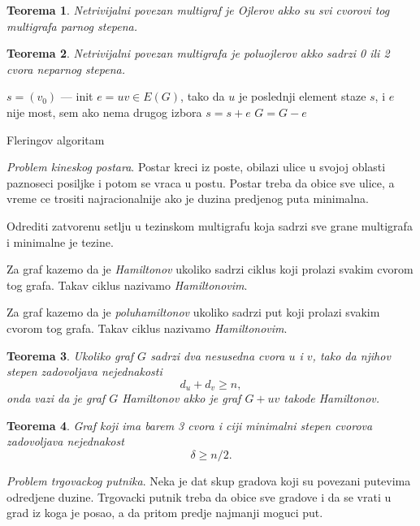 \documentclass[12p, a4paper]{article}
\newtheorem*{theorem}{Teorema}
\begin{document}
\begin{multicols}{2}
    \begin{theorem}
        Netrivijalni povezan multigraf je Ojlerov akko su svi cvorovi tog 
        multigrafa parnog stepena.
    \end{theorem}

    \begin{theorem}
        Netrivijalni povezan multigrafa je poluojlerov akko sadrzi
        0 ili 2 cvora neparnog stepena.
    \end{theorem}

    \begin{algorithm}[H]
        $s = (v_0)$ --- init\;
        {$e = uv \in E(G)$, tako da $u$ je poslednji element staze $s$, 
        i $e$ nije most, sem ako nema drugog izbora\;
        $s = s + e$\;
        $G = G - e$\;}
        \caption{Fleringov algoritam}
    \end{algorithm}

    \emph{Problem kineskog postara}. Postar kreci iz poste, obilazi ulice
    u svojoj oblasti paznoseci posiljke i potom se vraca u postu.
    Postar treba da obice sve ulice, a vreme ce trositi najracionalnije ako je
    duzina predjenog puta minimalna.

    Odrediti zatvorenu setlju u tezinskom multigrafu koja sadrzi sve grane 
    multigrafa i minimalne je tezine.

    Za graf kazemo da je \emph{Hamiltonov} ukoliko sadrzi ciklus koji prolazi 
    svakim cvorom tog grafa. Takav ciklus nazivamo \emph{Hamiltonovim}.

    Za graf kazemo da je \emph{poluhamiltonov} ukoliko sadrzi put koji prolazi 
    svakim cvorom tog grafa. Takav ciklus nazivamo \emph{Hamiltonovim}.

    \begin{theorem}
        Ukoliko graf $G$ sadrzi dva nesusedna cvora $u$ i $v$, tako da njihov
        stepen zadovoljava nejednakosti \[d_u + d_v \geq n,\] onda vazi
        da je graf $G$ Hamiltonov akko je graf $G + uv$ takode Hamiltonov.
    \end{theorem}

    \begin{theorem}
        Graf koji ima barem 3 cvora i ciji minimalni stepen cvorova
        zadovoljava nejednakost \[\delta \geq n/2.\]
    \end{theorem}

    \emph{Problem trgovackog putnika}. 
    Neka je dat skup gradova koji su povezani putevima odredjene duzine. 
    Trgovacki putnik treba da obice sve gradove i da se vrati u grad iz koga
    je posao, a da pritom predje najmanji moguci put.


\end{multicols}
\end{document}
